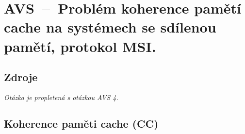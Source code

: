 

\graphicspath{{avs/koherence_pameti_cache/figures}}


\chapter{AVS~--~Problém koherence pamětí cache na systémech se sdílenou pamětí, protokol MSI.}


\section{Zdroje}

\begin{compactitem}
    \item {}
    \item {}
    \item {}
    \item {}
    \item \textit{Otázka je propletená s otázkou AVS 4.}
\end{compactitem}


\section{Koherence paměti cache (CC)}

